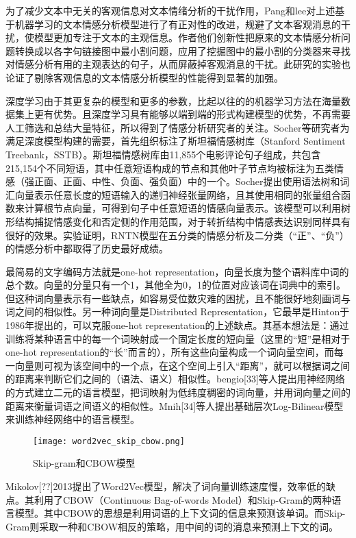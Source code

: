 为了减少文本中无关的客观信息对文本情绪分析的干扰作用，Pang和lee对上述基于机器学习的文本情感分析模型进行了有正对性的改进，规避了文本客观消息的干扰，使模型更加专注于文本的主观信息。作者他们创新性把原来的文本情感分析问题转换成以各字句链接图中最小割问题，应用了挖掘图中的最小割的分类器来寻找对情感分析有用的主观表达的句子，从而屏蔽掉客观消息的干扰。此研究的实验也论证了剔除客观信息的文本情感分析模型的性能得到显著的加强。


深度学习由于其更复杂的模型和更多的参数，比起以往的的机器学习方法在海量数据集上更有优势。且深度学习具有能够以端到端的形式构建模型的优势，不再需要人工筛选和总结大量特征，所以得到了情感分析研究者的关注。Socher等研究者为满足深度模型构建的需要，首先组织标注了斯坦福情感树库（Stanford Sentiment Treebank，SSTB）。斯坦福情感树库由11,855个电影评论句子组成，共包含215,154个不同短语，其中任意短语构成的节点和其他叶子节点均被标注为五类情感（强正面、正面、中性、负面、强负面）中的一个。Socher提出使用语法树和词汇向量表示任意长度的短语输入的递归神经张量网络，且其使用相同的张量组合函数来计算根节点向量，可得到句子中任意短语的情感向量表示。该模型可以利用树形结构捕捉情感变化和否定侧的作用范围，对于转折结构中情感表达识别同样具有很好的效果。实验证明，RNTN模型在五分类的情感分析及二分类（“正”、“负”）的情感分析中都取得了历史最好成绩。

最简易的文字编码方法就是one-hot representation，向量长度为整个语料库中词的总个数。向量的分量只有一个1，其他全为0，1的位置对应该词在词典中的索引。但这种词向量表示有一些缺点，如容易受位数灾难的困扰，且不能很好地刻画词与词之间的相似性。另一种词向量是Distributed Representation，它最早是Hinton于1986年提出的，可以克服one-hot representation的上述缺点。其基本想法是：通过训练将某种语言中的每一个词映射成一个固定长度的短向量（这里的“短”是相对于one-hot representation的“长”而言的），所有这些向量构成一个词向量空间，而每一向量则可视为该空间中的一个点，在这个空间上引入“距离”，就可以根据词之间的距离来判断它们之间的（语法、语义）相似性。bengio[33]等人提出用神经网络的方式建立二元的语言模型，把词映射为低纬度稠密的词向量，并用词向量之间的距离来衡量词语之间语义的相似性。Mnih[34]等人提出基础层次Log-Bilinear模型来训练神经网络中的语言模型。
\begin{figure}[htbp]
	\centering
	\texttt{[image: word2vec\_skip\_cbow.png]}
	\caption[rnn_vanish]{Skip-gram和CBOW模型}
\end{figure}
Mikolov[??]2013提出了Word2Vec模型，解决了词向量训练速度慢，效率低的缺点。其利用了CBOW（Continuous Bag-of-words Model）和Skip-Gram的两种语言模型。其中CBOW的思想是利用词语的上下文词的信息来预测该单词。而Skip-Gram则采取一种和CBOW相反的策略，用中间的词的消息来预测上下文的词。

